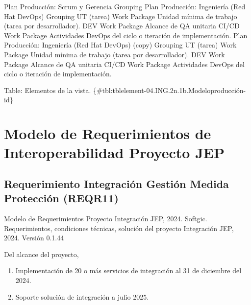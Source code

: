 \documentclass[
  paper=a4,
  ,captions=tableheading
]{scrartcl}
\providecommand{\tightlist}{%
  \setlength{\itemsep}{0pt}\setlength{\parskip}{0pt}}
\renewenvironment{quote}{\begin{customblockquote}\list{}{\rightmargin=0em\leftmargin=0em}%
\item\relax\color{blockquote-text}\ignorespaces}{\unskip\unskip\endlist\end{customblockquote}}
\begin{document}
\textbar{} \textbar{} Plan Producción: Scrum y Gerencia \textbar{}
Grouping \textbar{} \textbar{} \textbar{} Plan Producción: Ingeniería
(Red Hat DevOps) \textbar{} Grouping \textbar{} \textbar{} \textbar{} UT
(tarea) \textbar{} Work Package \textbar{} Unidad mínima de trabajo
(tarea por desarrollador). \textbar{} \textbar{} DEV \textbar{} Work
Package \textbar{} Alcance de QA unitaria \textbar{} \textbar{} CI/CD
\textbar{} Work Package \textbar{} Actividades DevOps del ciclo o
iteración de implementación. \textbar{} \textbar{} Plan Producción:
Ingeniería (Red Hat DevOps) (copy) \textbar{} Grouping \textbar{}
\textbar{} \textbar{} UT (tarea) \textbar{} Work Package \textbar{}
Unidad mínima de trabajo (tarea por desarrollador). \textbar{}
\textbar{} DEV \textbar{} Work Package \textbar{} Alcance de QA unitaria
\textbar{} \textbar{} CI/CD \textbar{} Work Package \textbar{}
Actividades DevOps del ciclo o iteración de implementación. \textbar{}

Table: Elementos de la vista.
\{\#tbl:tblelement-04.ING.2n.1b.Modeloproducción-id\}

\newpage

\section{Modelo de Requerimientos de Interoperabilidad Proyecto
JEP}\label{sec:modelo-de-requerimientos-de-interoperabilidad-proyecto-jep}

\subsection{Requerimiento Integración Gestión Medida Protección
(REQR11)}\label{sec:requerimiento-integraciuxf3n-gestiuxf3n-medida-protecciuxf3n-reqr11}

\begin{quote}
Modelo de Requerimientos Proyecto Integración JEP, 2024. Softgic.
Requerimientos, condiciones técnicas, solución del proyecto Integración
JEP, 2024. Versión 0.1.44
\end{quote}

Del alcance del proyecto,

\begin{enumerate}
\def\labelenumi{\arabic{enumi}.}
\tightlist
\item
  Implementación de 20 o más servicios de integración al 31 de diciembre
  del 2024.
\item
  Soporte solución de integración a julio 2025.
\end{enumerate}
\end{document}
